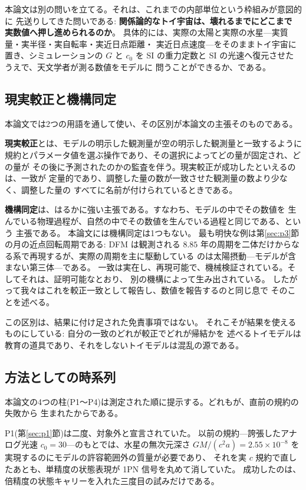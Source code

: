 \documentclass[a4paper,10pt,twocolumn]{ltjsarticle}
\begin{document}
本論文は別の問いを立てる。それは、これまでの内部単位という枠組みが意図的に
先送りしてきた問いである: \textbf{関係論的なトイ宇宙は、壊れるまでにどこまで
実数値へ押し進められるのか}。
具体的には、実際の太陽と実際の水星---実質量・実半径・実自転率・実近日点距離・
実近日点速度---をそのままトイ宇宙に置き、シミュレーションの $G$ と $c_0$ を
SI の重力定数と SI の光速へ復元させたうえで、天文学者が測る数値をモデルに
問うことができるか、である。

\subsection{現実較正と機構同定}
\label{sec:definitions}

本論文では2つの用語を通して使い、その区別が本論文の主張そのものである。

\textbf{現実較正}とは、モデルの明示した観測量が空の明示した観測量と一致するように
規約とパラメータ値を選ぶ操作であり、その選択によってどの量が固定され、どの量が
その後に予測されたのかの監査を伴う。現実較正が成功したといえるのは、一致が
定量的であり、調整した量の数が一致させた観測量の数より少なく、調整した量の
すべてに名前が付けられているときである。

\textbf{機構同定}は、はるかに強い主張である。すなわち、モデルの中でその数値を
生んでいる物理過程が、自然の中でその数値を生んでいる過程と同じである、という
主張である。
本論文には機構同定は1つもない。
最も明快な例は第\ref{sec:p3}節の月の近点回転周期である: DFM は観測される
$8.85$ 年の周期を二体だけからなる系で再現するが、実際の周期を主に駆動している
のは太陽摂動---モデルが含まない第三体---である。
一致は実在し、再現可能で、機械検証されている。そしてそれは、証明可能なとおり、
別の機構によって生み出されている。
したがって我々はこれを較正一致として報告し、数値を報告するのと同じ息で
そのことを述べる。

この区別は、結果に付け足された免責事項ではない。
それこそが結果を使えるものにしている: 自分の一致のどれが較正でどれが帰結かを
述べるトイモデルは教育の道具であり、それをしないトイモデルは混乱の源である。

\subsection{方法としての時系列}
\label{sec:chronology}

本論文の4つの柱(P1〜P4)は測定された順に提示する。どれもが、直前の規約の失敗から
生まれたからである。

P1(第\ref{sec:p1}節)は二度、対象外と宣言されていた。
以前の規約---誇張したアナログ光速 $c_0=30$---のもとでは、水星の無次元深さ
$GM/(c^{2}a)=2.55\times10^{-8}$ を実現するのにモデルの許容範囲外の質量が必要であり、
それを実 $c$ 規約で直したあとも、単精度の状態表現が 1PN 信号を丸めて消していた。
成功したのは、倍精度の状態キャリーを入れた三度目の試みだけである。
\end{document}

